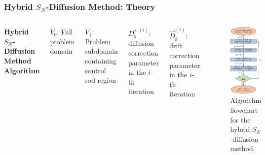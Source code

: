 \begin{frame}
  \frametitle{Hybrid $S_N$-Diffusion Method: Theory}
  \begin{columns}
    \textbf{Hybrid $S_N$-Diffusion Method Algorithm}
    \vspace{.5cm}

  {\small
  $V_0$: Full problem domain
  \vspace{.1cm}

  $V_1$: Problem subdomain containing control rod region
  \vspace{.1cm}

  $D^{s,(i)}_g$: diffusion correction parameter in the $i$-th iteration
  \vspace{.1cm}

  $\vec{D}^{(i)}_g$: drift correction parameter in the $i$-th iteration
\vspace{4cm}}
  \begin{figure}
    \centering
    \includegraphics[width=.46\textwidth]{images/algorithm}
    \begin{minipage}[b]{.49\textwidth}
      \caption{Algorithm flowchart for the hybrid $S_N$-diffusion method.}
    \end{minipage}
  \end{figure}
\end{columns}
\end{frame}

